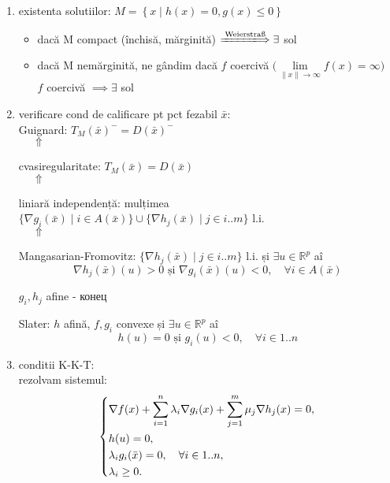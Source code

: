 \documentclass[11pt]{article}
\newcommand{\R}{\mathbb{R}}
\begin{document}
\begin{enumerate}
\item existenta solutiilor:  \(M = \left\{x \mid h(x) = 0, g(x) \leq 0 \right \}\)
\begin{itemize}
\item dacă M compact (închisă, mărginită) \(\xLongrightarrow{\text{Weierstraß}} \exists\) sol
\item dacă M nemărginită, ne gândim dacă \(f\) coercivă \(\Big( \lim\limits_{\|x\|\to \infty} f(x) = \infty \Big)\)\\
\(f\) coercivă \(\implies \exists\) sol
\end{itemize}
\item verificare cond de calificare pt pct fezabil \(\bar{x}\):\\
Guignard: \(T_M(\bar{x})^- = D(\bar{x})^- \)\\
\(~\quad \Uparrow\)

cvasiregularitate: \(T_M(\bar{x}) = D(\bar{x}) \)\\
\(~\quad \Uparrow\)

liniară independență: mulțimea \(
\{ \nabla g_i (\bar{x}) \mid i \in A(\bar{x}) \} \cup
\{ \nabla h_j (\bar{x}) \mid j \in i..m \} \) l.i. \\
\(~\quad \Uparrow\)

Mangasarian-Fromovitz: \( \{ \nabla h_j (\bar{x}) \mid j \in i..m \} \) l.i. și 
\(\exists u \in \R^p \) aî
\[\nabla h_j (\bar{x})(u) > 0 \text{ și } \nabla g_i(\bar{x})(u) < 0,\quad \forall i \in A(\bar{x}) \]

 \(g_i, h_j\) afine - конец
 \medskip

 Slater: \( h\) afină, \(f, g_i\) convexe și 
\(\exists u \in \R^p \) aî
\[ h(u) = 0 \text{ și } g_i(u) < 0, \quad \forall i \in 1..n \]
\item conditii K-K-T:\\
rezolvam sistemul:
\[
\begin{dcases}
\nabla f(x) + \sum_{i=1}^n \lambda_i \nabla  g_i(x) + \sum_{j=1}^m \mu_j \nabla  h_j(x) = 0,\\
h(u) = 0,\\
\lambda_i g_i(\bar{x}) = 0, \quad \forall i \in 1..n,\\
\lambda_i \geq 0.
\end{dcases}
\]
\end{enumerate}
\end{document}
